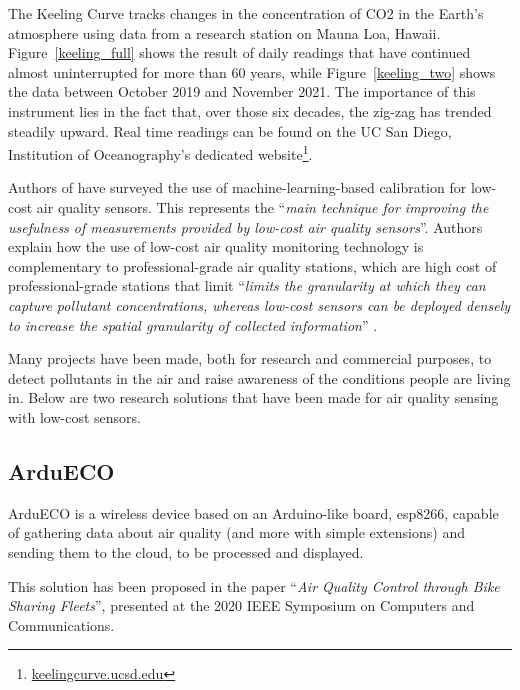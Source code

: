 		The Keeling Curve tracks changes in the concentration of CO2 in the Earth's atmosphere using data from a research station on Mauna Loa, Hawaii.
		Figure~\ref{keeling_full} shows the result of daily readings that have continued almost uninterrupted for more than 60 years, while Figure~\ref{keeling_two} shows the data between October 2019 and November 2021.
		The importance of this instrument lies in the fact that, over those six decades, the zig-zag has trended steadily upward. 
		Real time readings can be found on the UC San Diego, Institution of Oceanography's dedicated website\footnote{ \url{keelingcurve.ucsd.edu}}.
		
		Authors of \cite{unknown} have surveyed the use of machine-learning-based calibration for low-cost air quality
		sensors.
		This represents the ``\textit{main technique for improving the usefulness of measurements provided by low-cost air quality sensors}''.
		Authors explain how the use of low-cost air quality monitoring technology is complementary to professional-grade air quality stations, which are high cost of professional-grade stations that limit ``\textit{limits the granularity at which they can capture pollutant concentrations, whereas low-cost sensors can be deployed densely to increase the spatial granularity of collected information}'' \cite{unknown}.
		
		Many projects have been made, both for research and commercial purposes, to detect pollutants in the air and raise awareness of the conditions people are living in.
		Below are two research solutions that have been made for air quality sensing with low-cost sensors.
			
		\subsection{ArduECO}\label{subsec:ardueco}
			
			ArduECO is a wireless device based on an Arduino-like board, esp8266, capable of gathering data about air quality (and more with simple extensions) and sending them to the cloud, to be processed and displayed.

			This solution has been proposed in the paper ``\textit{Air Quality Control through Bike Sharing Fleets}''\cite{ardueco_paper}, presented at the 2020 IEEE Symposium on Computers and Communications.
			
